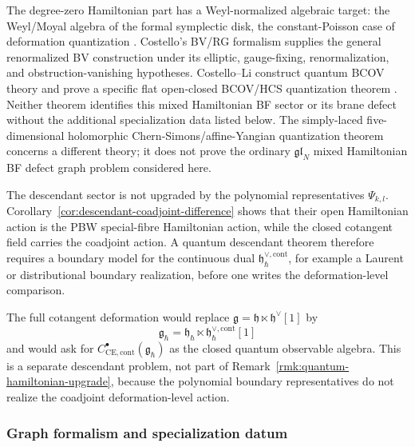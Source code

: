 \documentclass[11pt]{memoir}
\begin{document}
\begin{rmk}
  The degree-zero Hamiltonian part has a Weyl-normalized algebraic target:
  the Weyl/Moyal algebra of the formal symplectic disk, the constant-Poisson
  case of deformation quantization \cite{kontsevich-dq}. Costello's BV/RG
  formalism supplies the general renormalized BV construction under its
  elliptic, gauge-fixing, renormalization, and obstruction-vanishing
  hypotheses. Costello--Li construct
  quantum BCOV theory and prove a specific flat open-closed BCOV/HCS
  quantization theorem \cites{costello-li-quantum-bcov,costello-li-open-closed-bcov}.
  Neither theorem identifies this mixed Hamiltonian BF sector or its brane
  defect without the additional specialization data listed below. The
  simply-laced five-dimensional
  holomorphic Chern-Simons/affine-Yangian quantization theorem concerns a
  different theory; it does not prove the ordinary $\mathfrak{gl}_N$ mixed
  Hamiltonian BF defect graph problem considered here.
\end{rmk}

\begin{rmk}
  The descendant sector is not upgraded by the polynomial representatives
  $\Psi_{k,l}$. Corollary~\ref{cor:descendant-coadjoint-difference} shows that
	  their open Hamiltonian action is the PBW special-fibre Hamiltonian action, while the
  closed cotangent field carries the coadjoint action. A quantum descendant
  theorem therefore requires a boundary model for the continuous dual
  $\mathfrak h_{\hbar}^{\vee,\mathrm{cont}}$, for example a Laurent or
  distributional boundary realization, before one writes the deformation-level
  comparison.
\end{rmk}

\begin{rmk}
  The full cotangent deformation would replace
  $\mathfrak g=\mathfrak h\ltimes\mathfrak h^\vee[1]$ by
  $$\mathfrak g_\hbar=\mathfrak h_\hbar\ltimes
    \mathfrak h_{\hbar}^{\vee,\mathrm{cont}}[1]$$
  and would ask for
  $C^\bullet_{\mathrm{CE},\mathrm{cont}}(\mathfrak g_\hbar)$ as the closed
  quantum observable algebra. This is a separate descendant problem, not part of
  Remark~\ref{rmk:quantum-hamiltonian-upgrade}, because the polynomial
  boundary representatives do not realize the coadjoint deformation-level
  action.
\end{rmk}

\subsubsection{Graph formalism and specialization datum}
\end{document}
